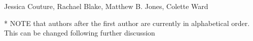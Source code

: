 Jessica Couture,
Rachael Blake,
Matthew B. Jones,
Colette Ward

* NOTE that authors after the first author are currently in alphabetical order.  This can be changed following further discussion

